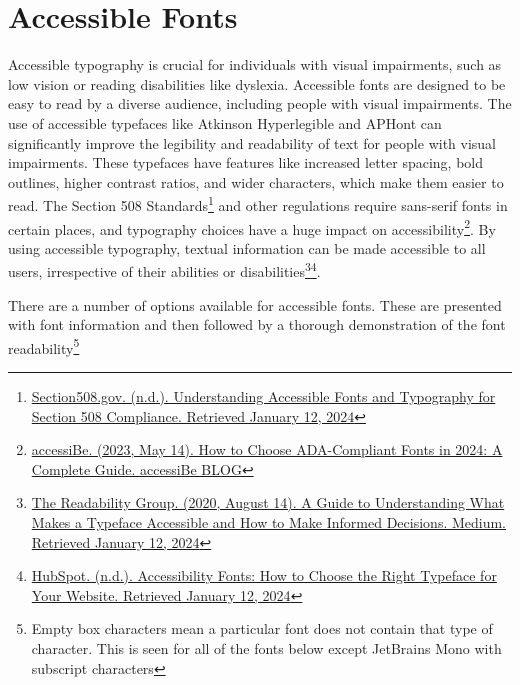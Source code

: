 \chapter{Accessible Fonts}\label{appx66}
\begin{raggedright}
Accessible typography is crucial for individuals with visual impairments, such as low vision or reading disabilities like dyslexia. Accessible fonts are designed to be easy to read by a diverse audience, including people with visual impairments. The use of accessible typefaces like Atkinson Hyperlegible and APHont can significantly improve the legibility and readability of text for people with visual impairments. These typefaces have features like increased letter spacing, bold outlines, higher contrast ratios, and wider characters, which make them easier to read. The Section 508 Standards\footnote{\raggedright \href{https://blog.hubspot.com/website/accessibility-fonts}{Section508.gov. (n.d.). Understanding Accessible Fonts and Typography for Section 508 Compliance. Retrieved January 12, 2024}} and other regulations require sans-serif fonts in certain places, and typography choices have a huge impact on accessibility\footnote{\raggedright \href{https://accessibe.com/blog/knowledgebase/ada-compliant-fonts}{accessiBe. (2023, May 14). How to Choose ADA-Compliant Fonts in 2024: A Complete Guide. accessiBe BLOG}}. By using accessible typography, textual information can be made accessible to all users, irrespective of their abilities or disabilities\footnote{\raggedright \href{https://medium.com/the-readability-group/a-guide-to-understanding-what-makes-a-typeface-accessible-and-how-to-make-informed-decisions-9e5c0b9040a0}{The Readability Group. (2020, August 14). A Guide to Understanding What Makes a Typeface Accessible and How to Make Informed Decisions. Medium. Retrieved January 12, 2024}}\footnote{\raggedright \href{https://blog.hubspot.com/website/accessibility-fonts}{HubSpot. (n.d.). Accessibility Fonts: How to Choose the Right Typeface for Your Website. Retrieved January 12, 2024}}.

There are a number of options available for accessible fonts. These are presented with font information and then followed by a thorough demonstration of the font readability\footnote{\raggedright Empty box characters mean a particular font does not contain that type of character. This is seen for all of the fonts below except JetBrains Mono with subscript characters}
\end{raggedright}

